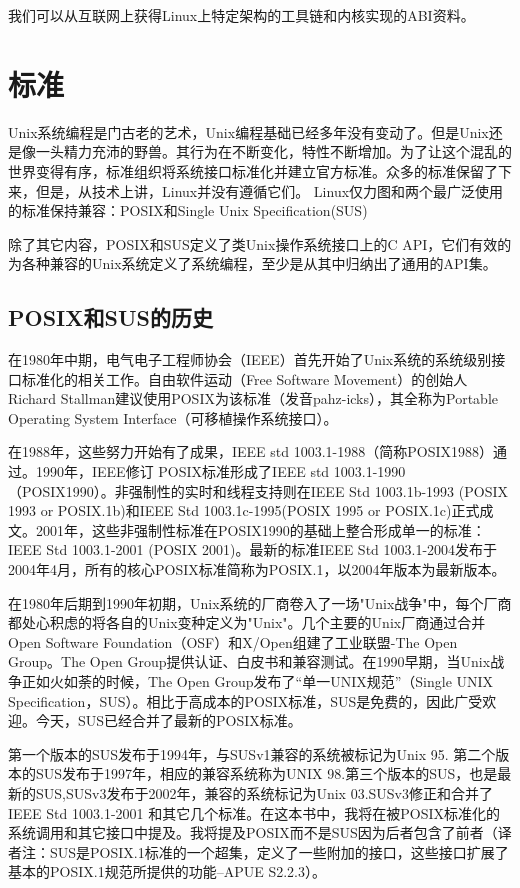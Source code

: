 我们可以从互联网上获得Linux上特定架构的工具链和内核实现的ABI资料。 

\section{标准}
Unix系统编程是门古老的艺术，Unix编程基础已经多年没有变动了。但是Unix还是像一头精力充沛的野兽。其行为在不断变化，特性不断增加。为了让这个混乱的世界变得有序，标准组织将系统接口标准化并建立官方标准。众多的标准保留了下来，但是，从技术上讲，Linux并没有遵循它们。 Linux仅力图和两个最广泛使用的标准保持兼容：POSIX和Single Unix Specification(SUS)

除了其它内容，POSIX和SUS定义了类Unix操作系统接口上的C API，它们有效的为各种兼容的Unix系统定义了系统编程，至少是从其中归纳出了通用的API集。

\subsection{POSIX和SUS的历史}
在1980年中期，电气电子工程师协会（IEEE）首先开始了Unix系统的系统级别接口标准化的相关工作。自由软件运动（Free Software Movement）的创始人Richard Stallman建议使用POSIX为该标准（发音pahz-icks），其全称为Portable Operating System Interface（可移植操作系统接口）。

在1988年，这些努力开始有了成果，IEEE std 1003.1-1988（简称POSIX1988）通过。1990年，IEEE修订 POSIX标准形成了IEEE std 1003.1-1990（POSIX1990）。非强制性的实时和线程支持则在IEEE Std 1003.1b-1993 (POSIX 1993 or POSIX.1b)和IEEE Std 1003.1c-1995(POSIX 1995 or POSIX.1c)正式成文。2001年，这些非强制性标准在POSIX1990的基础上整合形成单一的标准：IEEE Std 1003.1-2001 (POSIX 2001)。最新的标准IEEE Std 1003.1-2004发布于2004年4月，所有的核心POSIX标准简称为POSIX.1，以2004年版本为最新版本。

在1980年后期到1990年初期，Unix系统的厂商卷入了一场"Unix战争"中，每个厂商都处心积虑的将各自的Unix变种定义为"Unix"。几个主要的Unix厂商通过合并Open Software Foundation（OSF）和X/Open组建了工业联盟-The Open Group。The Open Group提供认证、白皮书和兼容测试。在1990早期，当Unix战争正如火如荼的时候，The Open Group发布了“单一UNIX规范”（Single UNIX Specification，SUS）。相比于高成本的POSIX标准，SUS是免费的，因此广受欢迎。今天，SUS已经合并了最新的POSIX标准。

第一个版本的SUS发布于1994年，与SUSv1兼容的系统被标记为Unix 95. 第二个版本的SUS发布于1997年，相应的兼容系统称为UNIX 98.第三个版本的SUS，也是最新的SUS,SUSv3发布于2002年，兼容的系统标记为Unix 03.SUSv3修正和合并了IEEE Std 1003.1-2001 和其它几个标准。在这本书中，我将在被POSIX标准化的系统调用和其它接口中提及。我将提及POSIX而不是SUS因为后者包含了前者（译者注：SUS是POSIX.1标准的一个超集，定义了一些附加的接口，这些接口扩展了基本的POSIX.1规范所提供的功能--APUE S2.2.3）。 

